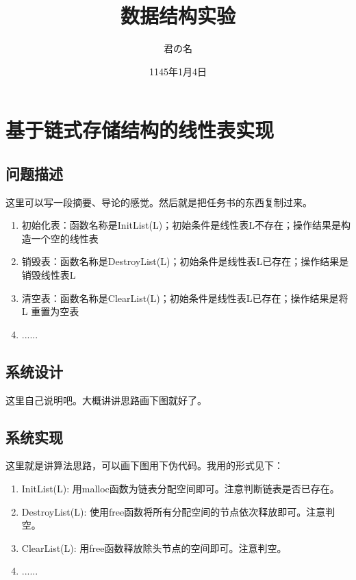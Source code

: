 \documentclass[supercite]{Experimental_Report}
\title{~~~~~~数据结构实验~~~~~~}
\author{君の名}
\date{1145年1月4日}
\theoremstyle{definition}
\begin{document}
\maketitle

\clearpage


\tableofcontents[level=2]

\clearpage


\section{基于链式存储结构的线性表实现}

\subsection{问题描述}
	这里可以写一段摘要、导论的感觉。然后就是把任务书的东西复制过来。
	\begin{enumerate}
		\item 初始化表：函数名称是InitList(L)；初始条件是线性表L不存在；操作结果是构
		造一个空的线性表
		\item 销毁表：函数名称是DestroyList(L)；初始条件是线性表L已存在；操作结果是
		销毁线性表L
		\item 清空表：函数名称是ClearList(L)；初始条件是线性表L已存在；操作结果是将L
		重置为空表
		\item ......
	\end{enumerate}

\subsection{系统设计}
	这里自己说明吧。大概讲讲思路画下图就好了。

\subsection{系统实现}
	这里就是讲算法思路，可以画下图用下伪代码。我用的形式见下：
	\begin{enumerate}
		\item InitList(L): 用malloc函数为链表分配空间即可。注意判断链表是否已存在。
		\item DestroyList(L): 使用free函数将所有分配空间的节点依次释放即可。注意判
		空。
		\item ClearList(L): 用free函数释放除头节点的空间即可。注意判空。
		\item ......
	\end{enumerate}
	
\end{document}
